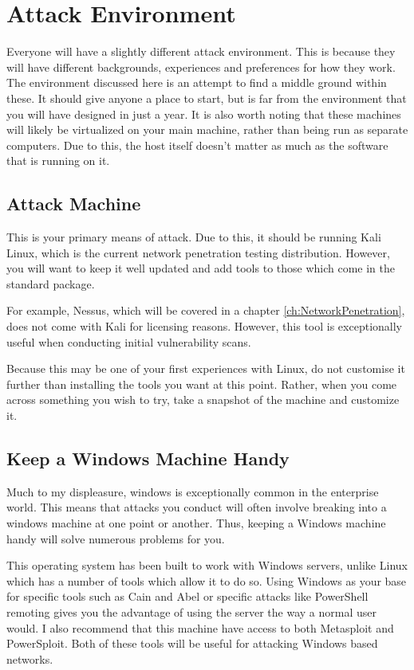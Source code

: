 	\section{Attack Environment}
		Everyone will have a slightly different attack environment. 
		This is because they will have different backgrounds, experiences and preferences for how they work. 
		The environment discussed here is an attempt to find a middle ground within these. 
		It should give anyone a place to start, but is far from the environment that you will have designed in just a year. 
		It is also worth noting that these machines will likely be virtualized on your main machine, rather than being run as separate computers\cite{playbook}.  
		Due to this, the host itself doesn't matter as much as the software that is running on it. 

		\subsection{Attack Machine}
			This is your primary means of attack. 
			Due to this, it should be running Kali Linux, which is the current network penetration testing distribution. 
			However, you will want to keep it well updated and add tools to those which come in the standard package. 

			For example, Nessus, which will be covered in a chapter \ref{ch:NetworkPenetration}, 
			does not come with Kali for licensing reasons. 
			However, this tool is exceptionally useful when conducting initial vulnerability scans. 

			Because this may be one of your first experiences with Linux, do not customise it further than installing the tools you want at this point. 
			Rather, when you come across something you wish to try, take a snapshot of the machine and customize it. 

		\subsection{Keep a Windows Machine Handy}
			Much to my displeasure, windows is exceptionally common in the enterprise world. 
			This means that attacks you conduct will often involve breaking into a windows machine at one point or another. 
			Thus, keeping a Windows machine handy will solve numerous problems for you. 
			
			This operating system has been built to work with Windows servers, unlike Linux which has a number of tools which allow it to do so. 
			Using Windows as your base for specific tools such as Cain and Abel or specific attacks like PowerShell remoting gives you the advantage of using the server the way a normal user would. 
			I also recommend that this machine have access to both Metasploit and PowerSploit. 
			Both of these tools will be useful for attacking Windows based networks. 

